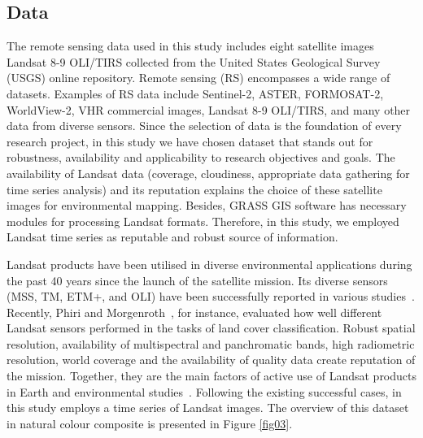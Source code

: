 \documentclass[jimaging,article,accept,pdftex,oneauthor]{Definitions/mdpi}
\begin{document}
\subsection{Data}

The remote sensing data used in this study includes eight satellite images Landsat 8-9 OLI/TIRS collected from the United States Geological Survey (USGS) online repository. {Remote sensing (RS) encompasses a wide range of datasets. Examples of RS data include Sentinel-2, ASTER, FORMOSAT-2, WorldView-2, VHR commercial images, Landsat 8-9 OLI/TIRS, and many other data from diverse sensors. Since the selection of data is the foundation of every research project, in this study we have chosen dataset that stands out for robustness, availability and applicability to research objectives and goals. The availability of Landsat data (coverage, cloudiness, appropriate data gathering for time series analysis) and its reputation explains the choice of these satellite images for environmental mapping. Besides, GRASS GIS software has necessary modules for processing Landsat formats. Therefore, in this study, we employed Landsat time series as reputable and robust source of information.}

Landsat products have been utilised in diverse environmental applications during the past 40 years since the launch of the satellite mission. Its diverse sensors (MSS, TM, ETM+, and OLI)  have been successfully reported in various studies~\cite{rs16122222,app142412020,land12111995,rs16193596}. {Recently, Phiri and Morgenroth}~\cite{rs9090967}, {for instance, evaluated how well different Landsat sensors performed in the tasks of land cover classification. Robust spatial resolution, availability of multispectral and panchromatic bands, high radiometric resolution, world coverage and the availability of quality data  create reputation of the mission. Together, they are the main factors of active use of Landsat products in Earth and environmental studies}~\cite{f15061055,rs17091510,analytics2030040,app15094653,rs17071163,asi6040061,su17083480}. {Following the existing successful cases, in this study employs a time series of Landsat images. }The overview of this dataset in natural colour composite is presented in Figure \ref{fig03}.
\end{document}
